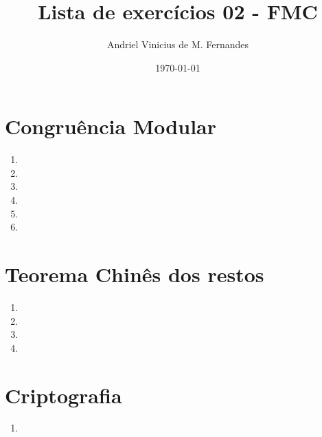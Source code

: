 \documentclass[12pt]{article}
\title{Lista de exercícios 02 - FMC}
\author{Andriel Vinicius de M. Fernandes}
\date{\today}
\begin{document}
\maketitle
\section{Congruência Modular}
\begin{enumerate}
	\item 
	\item 
	\item 
	\item 
	\item 
	\item 
\end{enumerate}
\section{Teorema Chinês dos restos}
\begin{enumerate}
	\item 
	\item 
	\item 
	\item 
\end{enumerate}
\section{Criptografia}
\begin{enumerate}
	\item 
\end{enumerate}
\end{document}
